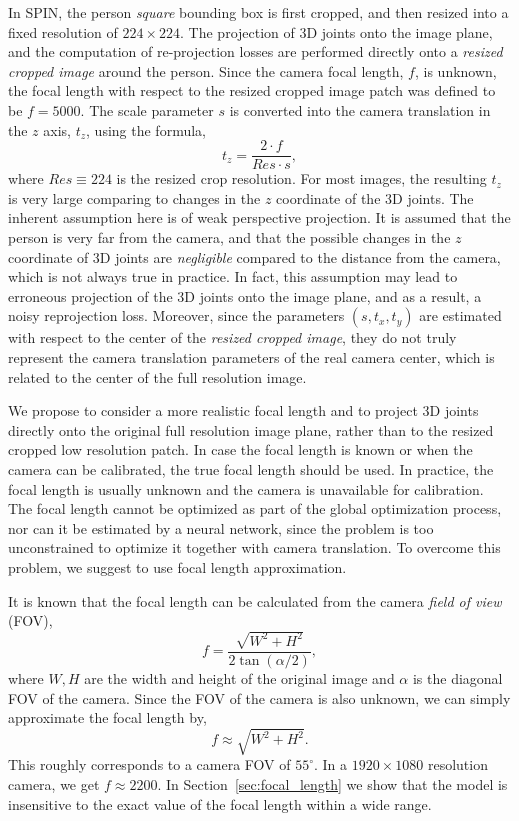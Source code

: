 \documentclass[runningheads]{llncs}
\begin{document}
In SPIN, the person \emph{square} bounding box is first cropped, and then resized into a fixed resolution of $ 224\times224 $. The projection of 3D joints onto the image plane, and the computation of re-projection losses are performed directly onto a \emph{resized cropped image} around the person. Since the camera focal length, $ f $, is unknown, the focal length with respect to the resized cropped image patch was defined to be $f=5000 $. The  scale  parameter $ s $ is converted into the camera translation in the $z$ axis, $ t_z $, using the formula,
\begin{equation}
t_z = \frac{2 \cdot f}{Res  \cdot s},
\label{tz_1}
\end{equation}
where  $ Res \equiv 224 $ is the resized crop resolution. For most images, the resulting $ t_z $ is very large comparing to changes in the $z$ coordinate of the 3D joints. The inherent assumption here is of weak perspective projection. It is assumed that the person is very far from the camera, and that the possible changes in the $z$ coordinate of 3D joints are \emph{negligible} compared to the distance from the camera, which is not always true in practice. In fact, this assumption may lead to erroneous projection of the 3D joints onto the image plane, and as a result, a noisy reprojection loss.  Moreover, since the parameters $ (s, t_x, t_y) $ are estimated with respect to the center of the \emph{resized cropped image}, they do not truly represent the camera translation parameters of the real camera center, which is related to the center of the full resolution image.     

We propose to consider a more realistic focal length and to project 3D joints directly onto the original full resolution image plane, rather than to the resized cropped low resolution patch. In case the focal length is known or when the camera can be calibrated, the true focal length should be used. In practice, the focal length is usually unknown and the camera is unavailable for calibration. The focal length cannot be optimized as part of the global optimization process, nor can it be estimated by a neural network, since the problem is too unconstrained to optimize it together with camera translation. To overcome this problem, we suggest to use focal length approximation. 

It is known that the focal length can be calculated from the camera \emph{field of view} (FOV),
\begin{equation}
f = \frac{\sqrt{W^2+H^2}}{2 \tan{(\alpha/2)}},
\end{equation}
where $ W, H $ are the width and height of the original image and $\alpha$ is the diagonal FOV of the camera. Since the FOV of the camera is also unknown, we can simply approximate the focal length by,
\begin{equation}
\label{eq:focal_length_approx}
f \approx \sqrt{W^2+H^2}.
\end{equation}
This roughly corresponds to a camera FOV of $ 55^{\circ} $. In a $ 1920 \times1080 $ resolution camera, we get $ f\approx 2200 $. In Section~\ref{sec:focal_length} we show that the model is insensitive to the exact value of the focal length within a wide range. 
\end{document}
